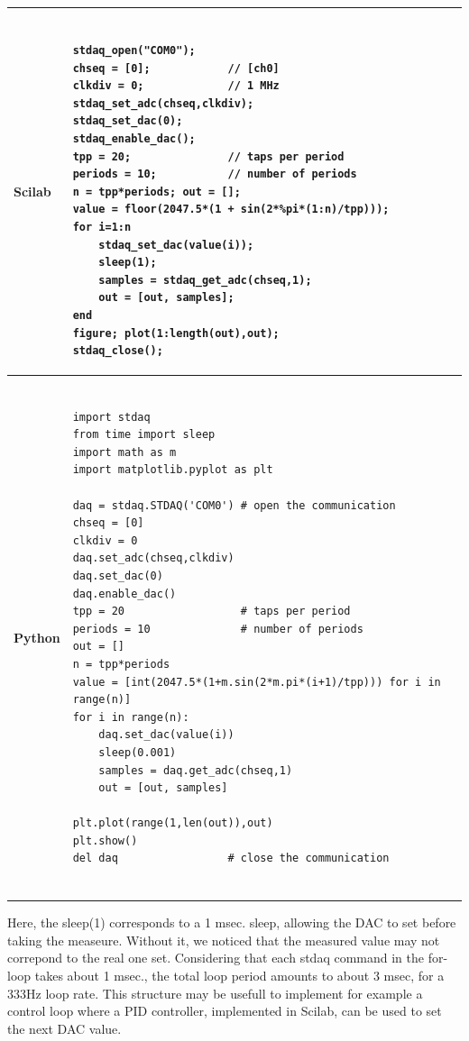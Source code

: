 \documentclass[letterpaper,10pt,english]{hitec}
\begin{document}
\begin{table}[!]
\begin{tabular}{|l|l|}
\hline
\cellcolor[HTML]{C0C0C0} \textbf{Scilab} & 
\begin{minipage}{4.5in}
\begin{verbatim}

stdaq_open("COM0");
chseq = [0];            // [ch0]
clkdiv = 0;             // 1 MHz
stdaq_set_adc(chseq,clkdiv);
stdaq_set_dac(0);
stdaq_enable_dac();
tpp = 20;               // taps per period 
periods = 10;           // number of periods
n = tpp*periods; out = [];
value = floor(2047.5*(1 + sin(2*%pi*(1:n)/tpp)));
for i=1:n
    stdaq_set_dac(value(i));
    sleep(1);
    samples = stdaq_get_adc(chseq,1);
    out = [out, samples];
end
figure; plot(1:length(out),out);
stdaq_close();

\end{verbatim}
\end{minipage}
\\ \hline
\cellcolor[HTML]{C0C0C0} \textbf{Python} & 
\begin{minipage}{4.5in}
\begin{verbatim}

import stdaq
from time import sleep
import math as m
import matplotlib.pyplot as plt

daq = stdaq.STDAQ('COM0') # open the communication
chseq = [0]
clkdiv = 0
daq.set_adc(chseq,clkdiv)
daq.set_dac(0)
daq.enable_dac()
tpp = 20                  # taps per period
periods = 10              # number of periods
out = []
n = tpp*periods
value = [int(2047.5*(1+m.sin(2*m.pi*(i+1)/tpp))) for i in range(n)]
for i in range(n):
    daq.set_dac(value(i))
    sleep(0.001)
    samples = daq.get_adc(chseq,1)
    out = [out, samples]
 
plt.plot(range(1,len(out)),out)
plt.show()
del daq                 # close the communication
    
\end{verbatim}
\end{minipage}
\\ \hline
\end{tabular}
\end{table}

Here, the sleep(1) corresponds to a 1 msec. sleep, allowing the DAC to set before taking the measeure. Without it, we noticed that the measured value may not correpond to the real one set.
Considering that each stdaq command in the for-loop takes about 1 msec., the total loop period amounts to about 3 msec, for a 333Hz loop rate. This structure may be usefull to implement for example a control loop where a PID controller, implemented in Scilab, can be used to set the next DAC value.
\end{document}
